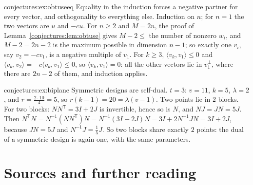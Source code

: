 \begin{solution}{conjectures:ex:obtuseeq}
\idea Equality in the induction forces a negative partner for every vector, and orthogonality to everything else.
\writeup Induction on $n$; for $n=1$ the two vectors are $u$ and $-cu$. For $n\ge2$ and $M=2n$, the proof of Lemma~\ref{conjectures:lem:obtuse} gives
$M-2\le$ the number of nonzero $w_i$, and $M-2=2n-2$ is the maximum possible in dimension $n-1$; so exactly one $v_i$, say $v_2=-cv_1$, is a negative
multiple of $v_1$. For $k\ge3$, $\langle v_k,v_1\rangle\le0$ and $\langle v_k,v_2\rangle=-c\langle v_k,v_1\rangle\le0$, so $\langle v_k,v_1\rangle=0$:
all the other vectors lie in $v_1^\perp$, where there are $2n-2$ of them, and induction applies.
\end{solution}

\begin{solution}{conjectures:ex:biplane}
\idea Symmetric designs are self-dual.
\writeup $t=3$: $v=11$, $k=5$, $\lambda=2$, and $r=\frac{2\cdot10}{4}=5$, so $r(k-1)=20=\lambda(v-1)$. Two points lie in $2$ blocks. For two blocks:
$NN^{\mathsf T}=3I+2J$ is invertible, hence so is $N$, and $NJ=JN=5J$. Then $N^{\mathsf T}N=N^{-1}(NN^{\mathsf T})N=N^{-1}(3I+2J)N=3I+2N^{-1}JN=3I+2J$,
because $JN=5J$ and $N^{-1}J=\frac15J$. So two blocks share exactly $2$ points: the dual of a symmetric design is again one, with the same parameters.
\end{solution}

\section*{Sources and further reading}

